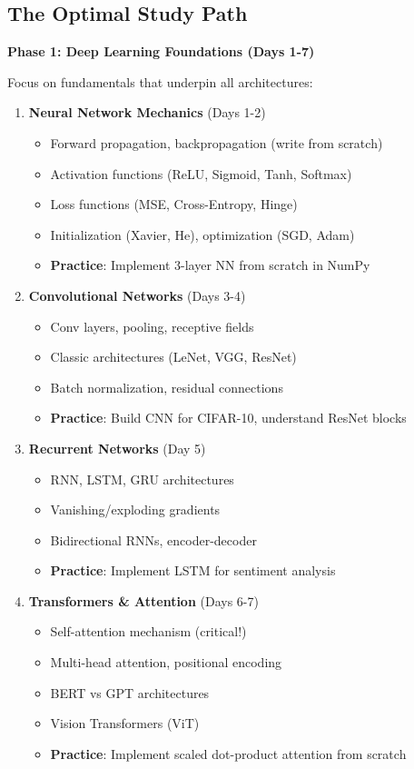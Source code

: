 \documentclass[10pt]{article}
\begin{document}
\subsection{The Optimal Study Path}

\textbf{Phase 1: Deep Learning Foundations (Days 1-7)}

Focus on fundamentals that underpin all architectures:
\begin{enumerate}
\item \textbf{Neural Network Mechanics} (Days 1-2)
\begin{itemize}
\item Forward propagation, backpropagation (write from scratch)
\item Activation functions (ReLU, Sigmoid, Tanh, Softmax)
\item Loss functions (MSE, Cross-Entropy, Hinge)
\item Initialization (Xavier, He), optimization (SGD, Adam)
\item \textbf{Practice}: Implement 3-layer NN from scratch in NumPy
\end{itemize}

\item \textbf{Convolutional Networks} (Days 3-4)
\begin{itemize}
\item Conv layers, pooling, receptive fields
\item Classic architectures (LeNet, VGG, ResNet)
\item Batch normalization, residual connections
\item \textbf{Practice}: Build CNN for CIFAR-10, understand ResNet blocks
\end{itemize}

\item \textbf{Recurrent Networks} (Day 5)
\begin{itemize}
\item RNN, LSTM, GRU architectures
\item Vanishing/exploding gradients
\item Bidirectional RNNs, encoder-decoder
\item \textbf{Practice}: Implement LSTM for sentiment analysis
\end{itemize}

\item \textbf{Transformers \& Attention} (Days 6-7)
\begin{itemize}
\item Self-attention mechanism (critical!)
\item Multi-head attention, positional encoding
\item BERT vs GPT architectures
\item Vision Transformers (ViT)
\item \textbf{Practice}: Implement scaled dot-product attention from scratch
\end{itemize}
\end{enumerate}
\end{document}
